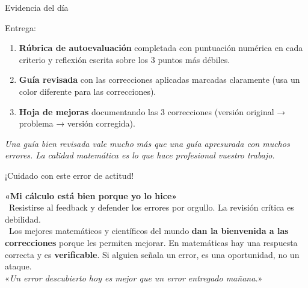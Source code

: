 \documentclass[aspectratio=169, 10pt, spanish]{beamer}
\begin{document}
\begin{frame}{Evidencia del día}
  \begin{evidenciabox}
    Entrega:
    \begin{enumerate}
      \item \textbf{Rúbrica de autoevaluación} completada
            con puntuación numérica en cada criterio y
            reflexión escrita sobre los 3 puntos más débiles.
      \item \textbf{Guía revisada} con las correcciones
            aplicadas marcadas claramente (usa un color diferente
            para las correcciones).
      \item \textbf{Hoja de mejoras} documentando las 3 correcciones
            (versión original → problema → versión corregida).
    \end{enumerate}
    \vspace{4pt}
    \textit{Una guía bien revisada vale mucho más que una
    guía apresurada con muchos errores. La calidad matemática
    es lo que hace profesional vuestro trabajo.}
  \end{evidenciabox}
\end{frame}

\begin{frame}{¡Cuidado con este error de actitud!}
  \begin{errorbox}
    \textbf{«Mi cálculo está bien porque yo lo hice»}\\[6pt]
    \incorrecto\ Resistirse al feedback y defender los errores
    por orgullo. La revisión crítica es debilidad.\\[8pt]
    \correcto\ Los mejores matemáticos y científicos del mundo
    \textbf{dan la bienvenida a las correcciones} porque les
    permiten mejorar. En matemáticas hay una respuesta correcta
    y es \textbf{verificable}. Si alguien señala un error, es
    una oportunidad, no un ataque.\\[6pt]
    «\textit{Un error descubierto hoy es mejor que
    un error entregado mañana.}»
  \end{errorbox}
\end{frame}
\end{document}

